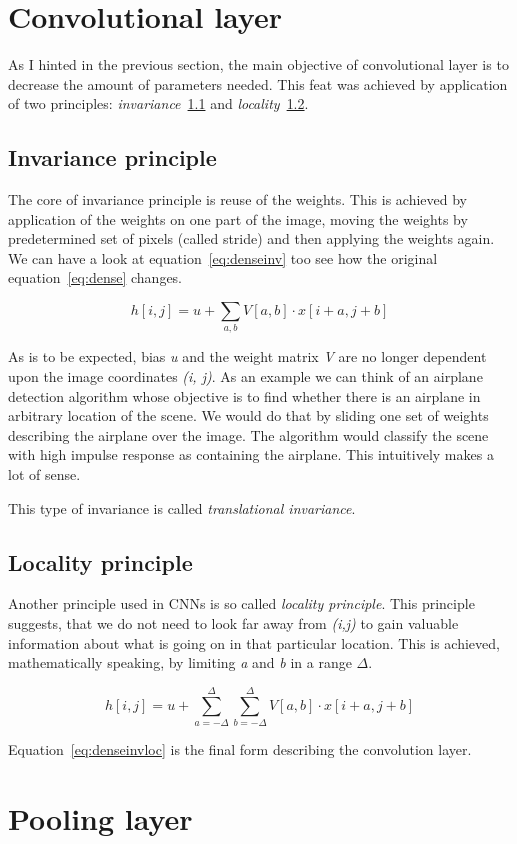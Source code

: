 \section{Convolutional layer}\label{sec:convolutional}
As I hinted in the previous section, the main objective of convolutional layer is to decrease the amount of parameters
needed.
This feat was achieved by application of two principles: \textit{invariance}~\ref{subsec:invariance} and
\textit{locality}~\ref{subsec:locality}.

\subsection{Invariance principle}\label{subsec:invariance}
The core of invariance principle is reuse of the weights.
This is achieved by application of the weights on one part of the image, moving the weights by predetermined set
of pixels (called stride) and then applying the weights again.
We can have a look at equation~\ref{eq:denseinv} too see how the original equation~\ref{eq:dense} changes.

\begin{equation}\label{eq:denseinv}
h[i, j] = u + \sum_{a,b} V[a,b] \cdot x[i+a,j+b]
\end{equation}

As is to be expected, bias \textit{u} and the weight matrix \textit{V} are no longer dependent upon the image
coordinates \textit{(i, j)}.
As an example we can think of an airplane detection algorithm whose objective is to find whether there is an airplane
in arbitrary location of the scene.
We would do that by sliding one set of weights describing the airplane over the image.
The algorithm would classify the scene with high impulse response as containing the airplane.
This intuitively makes a lot of sense.

This type of invariance is called \textit{translational invariance}.

\subsection{Locality principle}\label{subsec:locality}
Another principle used in CNNs is so called \textit{locality principle}.
This principle suggests, that we do not need to look far away from \textit{(i,j)} to gain valuable information about
what is going on in that particular location.
This is achieved, mathematically speaking, by limiting \textit{a} and \textit{b} in a range $\Delta$.

\begin{equation}\label{eq:denseinvloc}
h[i, j] = u + \sum_{a=-\Delta}^{\Delta} \sum_{b=-\Delta}^{\Delta} V[a,b] \cdot x[i+a,j+b]
\end{equation}

Equation~\ref{eq:denseinvloc} is the final form describing the convolution layer.

\section{Pooling layer}\label{sec:pooling}

